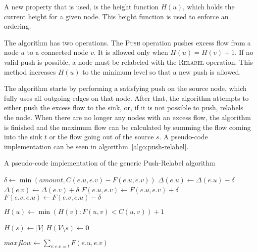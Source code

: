 A new property that is used, is the height function $H(u)$, which holds the current height for a given node. This height function is used to enforce an ordering.

The algorithm has two operations. The \textsc{Push} operation pushes excess flow from a node $u$ to a connected node $v$. It is allowed only when $H(u) = H(v) + 1$. If no valid push is possible, a node must be relabeled with the \textsc{Relabel} operation. This method increases $H(u)$ to the minimum level so that a new push is allowed.

The algorithm starts by performing a satisfying push on the source node, which fully uses all outgoing edges on that node. After that, the algorithm attempts to either push the excess flow to the sink, or, if it is not possible to push, relabels the node. When there are no longer any nodes with an excess flow, the algorithm is finished and the maximum flow can be calculated by summing the flow coming into the sink $t$ or the flow going out of the source $s$. A pseudo-code implementation can be seen in algorithm~\autoref{algo:push-relabel}.

\begin{algorithm}
\caption{A pseudo-code implementation of the generic Push-Relabel algorithm}
\label{algo:push-relabel}

\begin{algorithmic}
	\State $\delta \gets \min(amount, C(e.u, e.v) - F(e.u, e.v))$
	\State $\Delta(e.u) \gets \Delta(e.u) - \delta$
	\State $\Delta(e.v) \gets \Delta(e.v) + \delta$
	\State $F(e.u, e.v) \gets F(e.u, e.v) + \delta$
	\State $F(e.v, e.u) \gets F(e.v, e.u) - \delta$
\EndFunction

\State

	\State $H(u) \gets \min(H(v) : F(u, v) < C(u, v)) + 1$
\EndFunction

\State

	\State {}
\EndFor

\State

\State $H(s) \gets |V|$
\State $H(V \setminus s) \gets 0$

\State

		\State {}
	\Else
		\State {}
	\EndIf
\EndWhile

\State

\State $maxflow \gets \sum\limits_{e : e.v = t} F(e.u, e.v)$
\end{algorithmic}
\end{algorithm}

